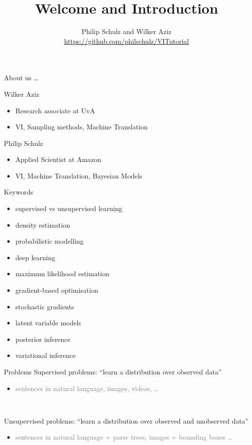 \documentclass[14pt]{beamer}
\title{Welcome and Introduction}
\date{}
\author[Schulz and Aziz]{Philip Schulz and Wilker Aziz \\
\url{https://github.com/philschulz/VITutorial}}
\begin{document}
\frame{\titlepage}

\begin{frame}{About us \ldots}
\begin{block}{Wilker Aziz}
\begin{itemize}
\item Research associate at UvA
\item VI, Sampling methods, Machine Translation
\end{itemize}
\end{block}

\begin{block}{Philip Schulz}
\begin{itemize}
\item Applied Scientist at Amazon
\item VI, Machine Translation, Bayesian Models
\end{itemize}
\end{block}
\end{frame}

\begin{frame}{Keywords}

\begin{itemize}
	\item supervised vs unsupervised learning
	\item density estimation
	\item probabilistic modelling
	\item deep learning
	\item maximum likelihood estimation
	\item gradient-based optimisation
	\item stochastic gradients
	\item latent variable models
	\item posterior inference
	\item variational inference
\end{itemize}

\end{frame}

\begin{frame}{Problems}
Supervised problems: \alert{``learn a distribution over observed data''}
\begin{itemize}
	\item \textcolor{gray}{sentences in natural language, images, videos, \ldots}
\end{itemize}

~

Unsupervised problems: \alert{``learn a distribution over observed and unobserved data''}
\begin{itemize}
	\item \textcolor{gray}{sentences in natural language + parse trees, images + bounding boxes \ldots}
\end{itemize}


\end{frame}
\end{document}
